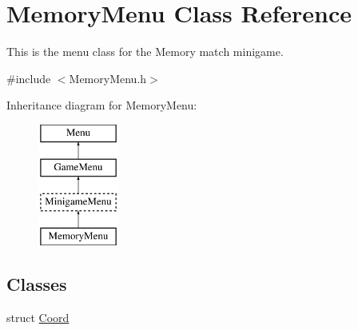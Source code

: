 \hypertarget{classMemoryMenu}{\section{Memory\-Menu Class Reference}
\label{classMemoryMenu}
}


This is the menu class for the Memory match minigame.  




{\ttfamily \#include $<$Memory\-Menu.\-h$>$}

Inheritance diagram for Memory\-Menu\-:\begin{figure}[H]
\begin{center}
\leavevmode
\includegraphics[height=4.000000cm]{classMemoryMenu}
\end{center}
\end{figure}
\subsection*{Classes}
\begin{DoxyCompactItemize}
\item 
struct \hyperlink{structMemoryMenu_1_1Coord}{Coord}
\end{DoxyCompactItemize}

